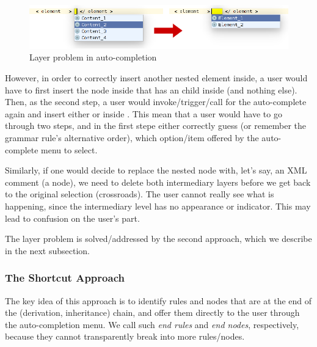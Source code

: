 \begin{figure}[ht]
	\centering
	\includegraphics[scale=0.5]{./images/layer_problem.png}
	\caption{Layer problem in auto-completion}
	\label{fig:layer_problem}
\end{figure}

However, in order to correctly insert another nested element inside, a user would have to first insert the  node inside  that has an  child inside (and nothing else).
Then, as the second step, a user would invoke/trigger/call for the auto-complete again and insert either  or  inside .
This mean that a user would have to go through two steps, and in the first stepe either correctly guess (or remember the grammar rule's alternative order), which option/item offered by the auto-complete menu to select.

Similarly, if one would decide to replace the nested  node with, let's say, an XML comment (a  node), we need to delete both intermediary layers before we get back to the original  selection (crossroads).
The user cannot really see what is happening, since the intermediary level has no appearance or indicator.
This may lead to confusion on the user's part.

The layer problem is solved/addressed by the second approach, which we describe in the next subsection.

\subsubsection{The Shortcut Approach}
\label{sect:shortcut_approach}

The key idea of this approach is to identify rules and nodes that are at the end of the (derivation, inheritance) chain, and offer them directly to the user through the auto-completion menu.
We call such \emph{end rules} and \emph{end nodes}, respectively, because they cannot transparently break into more rules/nodes.

